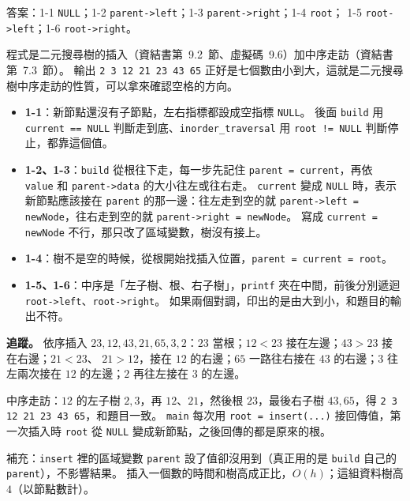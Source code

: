 \begin{pastsoln}
答案：1-1 \texttt{NULL}；1-2 \texttt{parent->left}；1-3 \texttt{parent->right}；1-4 \texttt{root}；
1-5 \texttt{root->left}；1-6 \texttt{root->right}。

程式是二元搜尋樹的插入（資結書第~9.2~節、虛擬碼~9.6）加中序走訪（資結書第~7.3~節）。 輸出
\texttt{2 3 12 21 23 43 65} 正好是七個數由小到大，這就是二元搜尋樹中序走訪的性質，可以拿來確認空格的方向。

\begin{itemize}
\item \textbf{1-1}：新節點還沒有子節點，左右指標都設成空指標 \texttt{NULL}。 後面 \texttt{build} 用
\texttt{current == NULL} 判斷走到底、\texttt{inorder\_traversal} 用 \texttt{root != NULL} 判斷停止，都靠這個值。
\item \textbf{1-2、1-3}：\texttt{build} 從根往下走，每一步先記住 \texttt{parent = current}，再依 \texttt{value} 和
\texttt{parent->data} 的大小往左或往右走。 \texttt{current} 變成 \texttt{NULL} 時，表示新節點應該接在
\texttt{parent} 的那一邊：往左走到空的就 \texttt{parent->left = newNode}，往右走到空的就
\texttt{parent->right = newNode}。 寫成 \texttt{current = newNode} 不行，那只改了區域變數，樹沒有接上。
\item \textbf{1-4}：樹不是空的時候，從根開始找插入位置，\texttt{parent = current = root}。
\item \textbf{1-5、1-6}：中序是「左子樹、根、右子樹」，\texttt{printf} 夾在中間，前後分別遞迴
\texttt{root->left}、\texttt{root->right}。 如果兩個對調，印出的是由大到小，和題目的輸出不符。
\end{itemize}

\textbf{追蹤。} 依序插入 $23, 12, 43, 21, 65, 3, 2$：$23$ 當根；$12 < 23$ 接在左邊；$43 > 23$ 接在右邊；$21 < 23$、
$21 > 12$，接在 $12$ 的右邊；$65$ 一路往右接在 $43$ 的右邊；$3$ 往左兩次接在 $12$ 的左邊；$2$ 再往左接在 $3$ 的左邊。
\begin{center}
\end{center}
中序走訪：$12$ 的左子樹 $2, 3$，再 $12$、$21$，然後根 $23$，最後右子樹 $43, 65$，得
\texttt{2 3 12 21 23 43 65}，和題目一致。 \texttt{main} 每次用 \texttt{root = insert(...)} 接回傳值，第一次插入時
\texttt{root} 從 \texttt{NULL} 變成新節點，之後回傳的都是原來的根。

補充：\texttt{insert} 裡的區域變數 \texttt{parent} 設了值卻沒用到（真正用的是 \texttt{build} 自己的
\texttt{parent}），不影響結果。 插入一個數的時間和樹高成正比，$O(h)$；這組資料樹高 $4$（以節點數計）。
\end{pastsoln}
